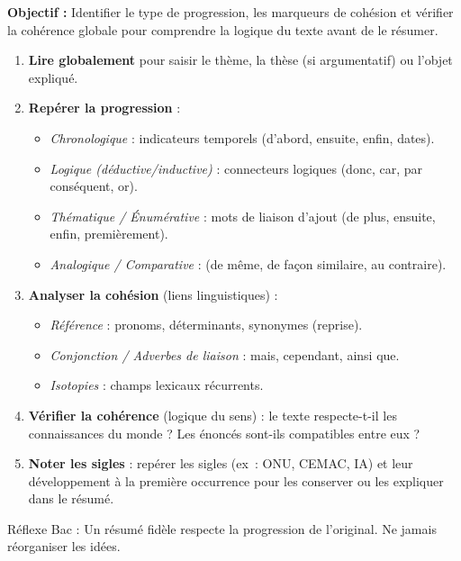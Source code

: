 \documentclass[11pt]{article}
\newcommand{\cle}[1]{{\popxbold\color{popdark}#1}}
\begin{document}
\begin{methode}
\textbf{Objectif :} Identifier le type de progression, les marqueurs de cohésion et vérifier la cohérence globale pour comprendre la logique du texte avant de le résumer.
\begin{enumerate}
    \item \textbf{Lire globalement} pour saisir le thème, la thèse (si argumentatif) ou l'objet expliqué.
    \item \textbf{Repérer la progression} : 
    \begin{itemize}
        \item \emph{Chronologique} : indicateurs temporels (d'abord, ensuite, enfin, dates).
        \item \emph{Logique (déductive/inductive)} : connecteurs logiques (donc, car, par conséquent, or).
        \item \emph{Thématique / Énumérative} : mots de liaison d'ajout (de plus, ensuite, enfin, premièrement).
        \item \emph{Analogique / Comparative} : (de même, de façon similaire, au contraire).
    \end{itemize}
    \item \textbf{Analyser la cohésion} (liens linguistiques) : 
    \begin{itemize}
        \item \emph{Référence} : pronoms, déterminants, synonymes (reprise).
        \item \emph{Conjonction / Adverbes de liaison} : mais, cependant, ainsi que.
        \item \emph{Isotopies} : champs lexicaux récurrents.
    \end{itemize}
    \item \textbf{Vérifier la cohérence} (logique du sens) : le texte respecte-t-il les connaissances du monde ? Les énoncés sont-ils compatibles entre eux ?
    \item \textbf{Noter les sigles} : repérer les sigles (ex~: \cle{ONU}, \cle{CEMAC}, \cle{IA}) et leur développement à la première occurrence pour les conserver ou les expliquer dans le résumé.
\end{enumerate}
\cle{Réflexe Bac} : Un résumé fidèle respecte la progression de l'original. Ne jamais réorganiser les idées.
\end{methode}
\end{document}
